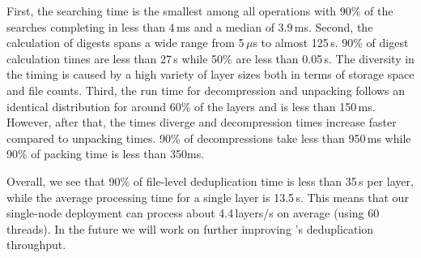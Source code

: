 First, the searching time is the smallest among all operations with 90\% of the
searches completing in less than 4\,ms and a median of 3.9\,ms.
%
%
%
Second, the calculation of digests spans a wide range from 5\,$\mu$s to almost
125\,s.
%
%
%
%
90\% of digest calculation times are less than 27\,s while 50\% are
less than 0.05\,s.
%
The diversity in the timing is caused by a high variety of layer sizes both in
terms of storage space and file counts.
%
%
%
Third, the run time for decompression and unpacking follows an identical
distribution for around 60\% of the layers and is less than 150\,ms.
%
%
However, after that, the times diverge and decompression times increase faster
compared to unpacking times.
%
%
90\% of decompressions take less than 950\,ms while 90\% of packing time is less
than 350ms.

%
Overall, we see that 90\% of file-level deduplication time is less than 35\,s
per layer, while the average processing time for a single layer is 13.5\,s.
%
This means that our single-node deployment can process about 4.4\,layers/s on average
(using 60 threads).
%
In the future we will work on further improving \sysname's deduplication throughput.
%
%

